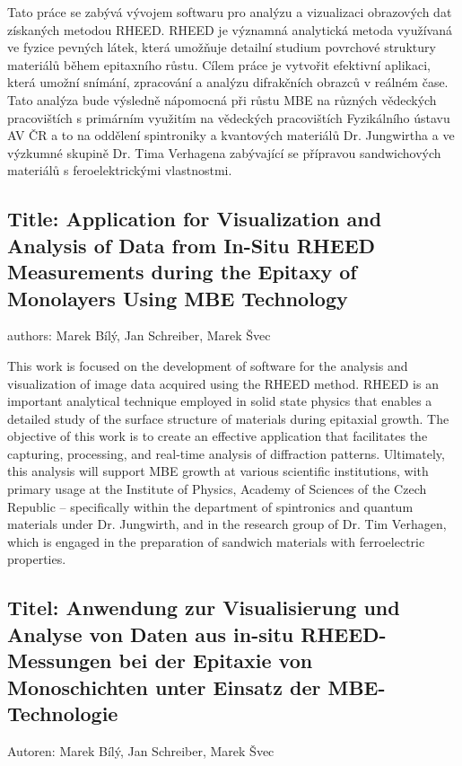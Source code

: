 \documentclass[a4paper,11pt]{article}
\begin{document}
Tato práce se zabývá vývojem softwaru pro analýzu a vizualizaci obrazových dat získaných metodou RHEED. RHEED je významná analytická metoda využívaná ve fyzice pevných látek, která umožňuje detailní studium povrchové struktury materiálů během epitaxního růstu. Cílem práce je vytvořit efektivní aplikaci, která umožní snímání, zpracování a analýzu difrakčních obrazců v reálném čase. Tato analýza bude výsledně nápomocná při růstu MBE na různých vědeckých pracovištích s primárním využitím na vědeckých pracovištích Fyzikálního ústavu AV ČR a to na oddělení spintroniky a kvantových materiálů Dr. Jungwirtha a ve výzkumné skupině Dr. Tima Verhagena zabývající se přípravou sandwichových materiálů s feroelektrickými vlastnostmi.

\subsection*{Title: Application for Visualization and Analysis of Data from In-Situ RHEED Measurements during the Epitaxy of Monolayers Using MBE Technology}
authors: Marek Bílý, Jan Schreiber, Marek Švec
\vspace{0.5cm}

This work is focused on the development of software for the analysis and visualization of image data acquired using the RHEED method. RHEED is an important analytical technique employed in solid state physics that enables a detailed study of the surface structure of materials during epitaxial growth. The objective of this work is to create an effective application that facilitates the capturing, processing, and real-time analysis of diffraction patterns. Ultimately, this analysis will support MBE growth at various scientific institutions, with primary usage at the Institute of Physics, Academy of Sciences of the Czech Republic – specifically within the department of spintronics and quantum materials under Dr. Jungwirth, and in the research group of Dr. Tim Verhagen, which is engaged in the preparation of sandwich materials with ferroelectric properties.

\subsection*{Titel: Anwendung zur Visualisierung und Analyse von Daten aus in-situ RHEED-Messungen bei der Epitaxie von Monoschichten unter Einsatz der MBE-Technologie}
Autoren: Marek Bílý, Jan Schreiber, Marek Švec
\vspace{0.5cm}
\end{document}

